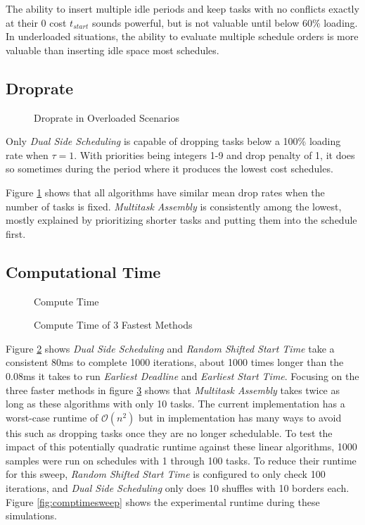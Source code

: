 \documentclass[conference]{IEEEtran}
\begin{document}
The ability to insert multiple idle periods and keep tasks with no conflicts exactly at their 0 cost $t_{start}$ sounds powerful, but is not valuable until below 60\% loading.
In underloaded situations, the ability to evaluate multiple schedule orders is more valuable than inserting idle space most schedules.

\subsection{Droprate}

\begin{figure}[h]
	\centering
	{}
	\caption{Droprate in Overloaded Scenarios}
	\label{fig:droprate}
\end{figure}

Only \emph{Dual Side Scheduling} is capable of dropping tasks below a 100\% loading rate when $\tau = 1$.
With priorities being integers 1-9 and drop penalty of 1, it does so sometimes during the period where it produces the lowest cost schedules.

Figure \ref{fig:droprate} shows that all algorithms have similar mean drop rates when the number of tasks is fixed.
\emph{Multitask Assembly} is consistently among the lowest, mostly explained by prioritizing shorter tasks and putting them into the schedule first.

\subsection{Computational Time}

\begin{figure}[h]
	\centering
	{}
	\caption{Compute Time}
	\label{fig:comptime5}
\end{figure}

\begin{figure}[h]
	\centering
	{}
	\caption{Compute Time of 3 Fastest Methods}
	\label{fig:comptime3}
\end{figure}

Figure \ref{fig:comptime5} shows \emph{Dual Side Scheduling} and \emph{Random Shifted Start Time} take a consistent 80ms to complete 1000 iterations, about 1000 times longer than the 0.08ms it takes to run \emph{Earliest Deadline} and \emph{Earliest Start Time}.
Focusing on the three faster methods in figure \ref{fig:comptime3} shows that \emph{Multitask Assembly} takes twice as long as these algorithms with only 10 tasks.
The current implementation has a worst-case runtime of $\mathcal{O}(n^2)$ but in implementation has many ways to avoid this such as dropping tasks once they are no longer schedulable.
To test the impact of this potentially quadratic runtime against these linear algorithms, 1000 samples were run on schedules with 1 through 100 tasks.
To reduce their runtime for this sweep, \emph{Random Shifted Start Time} is configured to only check 100 iterations, and \emph{Dual Side Scheduling} only does 10 shuffles with 10 borders each.
Figure \ref{fig:comptimesweep} shows the experimental runtime during these simulations.
\end{document}
